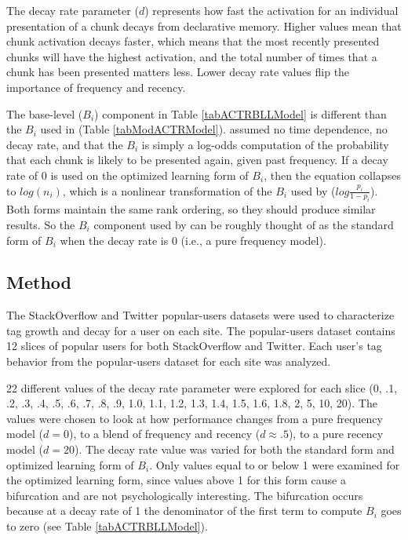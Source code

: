 \documentclass[man,donotrepeattitle]{apa6}
\begin{document}
The decay rate parameter ($d$) represents how fast the activation for an individual presentation of a chunk decays from declarative memory.
Higher values mean that chunk activation decays faster, which means that the most recently presented chunks will have the highest activation, and the total number of times that a chunk has been presented matters less.
Lower decay rate values flip the importance of frequency and recency.

The base-level ($B_{i}$) component in Table \ref{tabACTRBLLModel} is different than the $B_{i}$ used in \textcite{Stanley2013} (Table \ref{tabModACTRModel}).
\citeauthor{Stanley2013} assumed no time dependence, no decay rate, and that the $B_{i}$ is simply a log-odds computation of the probability that each chunk is likely to be presented again, given past frequency.
If a decay rate of 0 is used on the optimized learning form of $B_{i}$, then the equation collapses to $log \left ( n_{i} \right )$,
which is a nonlinear transformation of the $B_{i}$ used by \citeauthor{Stanley2013} ($log \frac{p_{i}}{1-p_{i}}$).
Both forms maintain the same rank ordering, so they should produce similar results.
So the $B_{i}$ component used by \citeauthor{Stanley2013} can be roughly thought of as the standard form of $B_{i}$ when the decay rate is 0 (i.e., a pure frequency model).

\subsection{Method}

The StackOverflow and Twitter popular-users datasets were used to characterize tag growth and decay for a user on each site.
The popular-users dataset contains 12 slices of popular users for both StackOverflow and Twitter.
Each user's tag behavior from the popular-users dataset for each site was analyzed. 

22 different values of the decay rate parameter were explored for each slice
(0, .1, .2, .3, .4, .5, .6, .7, .8, .9, 1.0, 1.1, 1.2, 1.3, 1.4, 1.5, 1.6, 1.8, 2, 5, 10, 20).
The values were chosen to look at how performance changes from a pure frequency model ($d=0$), to a blend of frequency and recency ($d \approx .5$), to a pure recency model ($d=20$).
The decay rate value was varied for both the standard form and optimized learning form of $B_{i}$. 
Only values equal to or below 1 were examined for the optimized learning form, since values above 1 for this form cause a bifurcation and are not psychologically interesting.
The bifurcation occurs because at a decay rate of 1 the denominator of the first term to compute $B_{i}$ goes to zero (see Table \ref{tabACTRBLLModel}).
\end{document}
